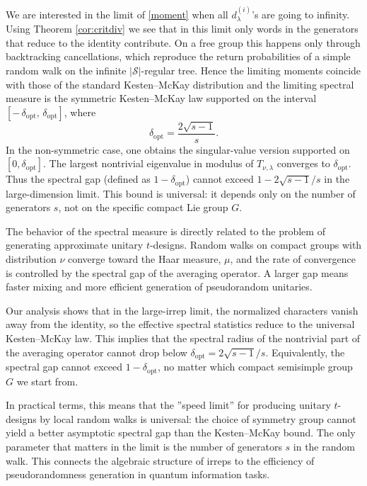 \documentclass[11pt, a4paper]{article}
\theoremstyle{definition}
\theoremstyle{remark}
\begin{document}
We are interested in the limit of \eqref{moment} when all $d_\lambda^{(i)}$'s are going to infinity. Using Theorem \ref{cor:critdiv} we see that in this limit only words in the generators that reduce to the identity 
contribute. On a free group this happens only through backtracking cancellations, which reproduce the return probabilities of a simple random walk on the infinite $|\mathcal{S}|$-regular tree. Hence the limiting moments coincide with those of the standard Kesten--McKay distribution and the limiting spectral measure is the symmetric 
Kesten--McKay law supported on the interval 
\([-\,\delta_{\mathrm{opt}},\,\delta_{\mathrm{opt}}]\), where
\begin{equation}
\delta_{\mathrm{opt}} = \frac{2\sqrt{s-1}}{s}.
\end{equation}
In the non-symmetric case, one obtains the singular-value version supported 
on \([0,\delta_{\mathrm{opt}}]\).
The largest nontrivial eigenvalue in modulus of $T_{\nu,\lambda}$ converges to 
$\delta_{\mathrm{opt}}$. Thus the spectral gap (defined as $1-\delta_{\mathrm{opt}}$) 
cannot exceed $1-2\sqrt{s-1}/s$ in the large-dimension limit. 
This bound is universal: it depends only on the number of generators $s$, not 
on the specific compact Lie group $G$. 


The behavior of the spectral measure is directly related to the problem of 
generating approximate unitary $t$-designs. Random walks on compact groups with distribution $\nu$ converge toward the Haar measure, $\mu$, and the rate of 
convergence is controlled by the spectral gap of the averaging operator. A larger gap means faster mixing and more efficient generation of pseudorandom unitaries.

Our analysis shows that in the large-irrep limit, the normalized characters vanish away from the identity, so the effective spectral statistics reduce to 
the universal Kesten--McKay law. This implies that the spectral radius of the 
nontrivial part of the averaging operator cannot drop below 
$\delta_{\text{opt}}=2\sqrt{s-1}/s$. Equivalently, the spectral gap cannot 
exceed $1-\delta_{\text{opt}}$, no matter which compact semisimple group $G$ we start from.

In practical terms, this means that the ''speed limit'' for producing unitary 
$t$-designs by local random walks is universal: the choice of symmetry group 
cannot yield a better asymptotic spectral gap than the Kesten--McKay bound. 
The only parameter that matters in the limit is the number of generators $s$ 
in the random walk. This connects the algebraic structure of irreps to the 
efficiency of pseudorandomness generation in quantum information tasks. 
\end{document}
